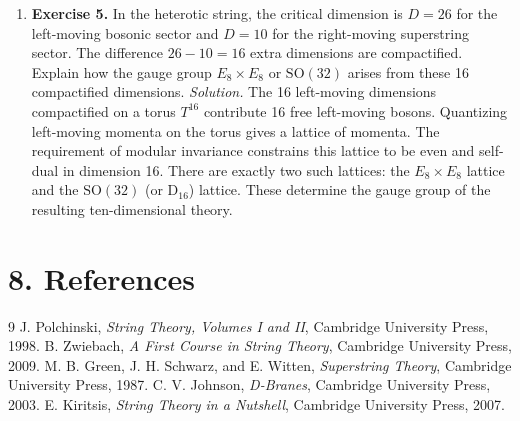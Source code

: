 \begin{enumerate}[leftmargin=*,itemsep=0.9em]
\item \textbf{Exercise 5.} In the heterotic string, the critical dimension is $D = 26$ for the left-moving bosonic sector and $D = 10$ for the right-moving superstring sector. The difference $26 - 10 = 16$ extra dimensions are compactified. Explain how the gauge group $E_8 \times E_8$ or $\mathrm{SO}(32)$ arises from these 16 compactified dimensions. \emph{Solution.} The 16 left-moving dimensions compactified on a torus $T^{16}$ contribute 16 free left-moving bosons. Quantizing left-moving momenta on the torus gives a lattice of momenta. The requirement of modular invariance constrains this lattice to be even and self-dual in dimension 16. There are exactly two such lattices: the $E_8 \times E_8$ lattice and the $\mathrm{SO}(32)$ (or $\mathrm{D}_{16}$) lattice. These determine the gauge group of the resulting ten-dimensional theory.

\end{enumerate}
\section*{8. References}
\begin{thebibliography}{9}
 J. Polchinski, \emph{String Theory, Volumes I and II}, Cambridge University Press, 1998.
 B. Zwiebach, \emph{A First Course in String Theory}, Cambridge University Press, 2009.
 M. B. Green, J. H. Schwarz, and E. Witten, \emph{Superstring Theory}, Cambridge University Press, 1987.
 C. V. Johnson, \emph{D-Branes}, Cambridge University Press, 2003.
 E. Kiritsis, \emph{String Theory in a Nutshell}, Cambridge University Press, 2007.
\end{thebibliography}
